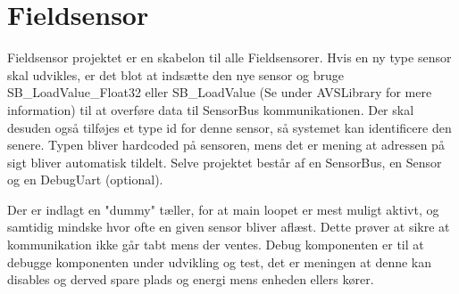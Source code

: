 \section{Fieldsensor}

Fieldsensor projektet er en skabelon til alle 
Fieldsensorer. Hvis en ny type sensor skal 
udvikles, er det blot at indsætte den nye sensor 
og bruge SB\_LoadValue\_Float32 eller SB\_LoadValue 
(Se under AVSLibrary for mere information) 
til at overføre data til SensorBus kommunikationen. 
Der skal desuden også tilføjes et type id for denne 
sensor, så systemet kan identificere den senere. Typen 
bliver hardcoded på sensoren, mens det er mening at 
adressen på sigt bliver automatisk tildelt.
Selve projektet består af en SensorBus, en Sensor 
og en DebugUart (optional).


Der er indlagt en "dummy" tæller, for at main loopet er 
mest muligt aktivt, og samtidig mindske hvor ofte en 
given sensor bliver aflæst. Dette prøver at sikre 
at kommunikation ikke går tabt mens der ventes. 
Debug komponenten er til at debugge komponenten under 
udvikling og test, det er meningen at denne kan disables 
og derved spare plads og energi mens enheden ellers kører.